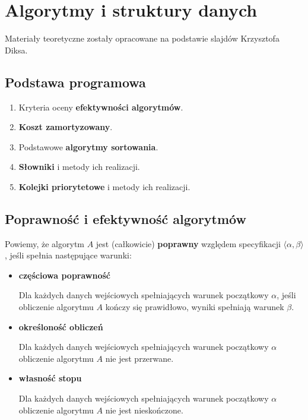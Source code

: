 \chapter{Algorytmy i struktury danych}

Materiały teoretyczne zostały opracowane na podstawie slajdów Krzysztofa Diksa. \; \textbf{}

\section*{Podstawa programowa}
\begin{enumerate}
    \item Kryteria oceny \textbf{efektywności algorytmów}.
    \item \textbf{Koszt zamortyzowany}.
    \item Podstawowe \textbf{algorytmy sortowania}.
    \item \textbf{Słowniki} i metody ich realizacji.
    \item \textbf{Kolejki priorytetowe} i metody ich realizacji.
\end{enumerate}

\section{Poprawność i efektywność algorytmów}
Powiemy, że algorytm $A$ jest (całkowicie) \textbf{poprawny} względem specyfikacji $\langle \alpha, \beta \rangle$, jeśli spełnia następujące warunki:
\begin{itemize}
    \item \textbf{częściowa poprawność}
    
    Dla każdych danych wejściowych spełniających warunek początkowy $\alpha$, jeśli obliczenie algorytmu $A$ kończy się prawidłowo, wyniki spełniają warunek $\beta$.
    
    \item \textbf{określoność obliczeń}
    
    Dla każdych danych wejściowych spełniających warunek początkowy $\alpha$ obliczenie algorytmu $A$ nie jest przerwane.
    
    \item \textbf{własność stopu}
    
    Dla każdych danych wejściowych spełniających warunek początkowy $\alpha$ obliczenie algorytmu $A$ nie jest nieskończone.
\end{itemize}


